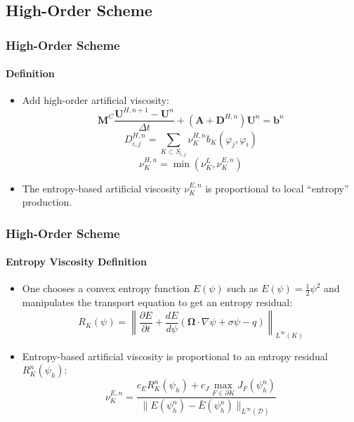\documentclass{beamer}
\newcommand{\pd}[2]{\frac{\partial #1}{\partial #2}}
\renewcommand{\ij}{_{i,j}}
\newcommand{\U}{\mathbf{U}}
\newcommand{\M}{\mathbf{M}}
\newcommand{\A}{\mathbf{A}}
\newcommand{\D}{\mathbf{D}}
\renewcommand{\b}{\mathbf{b}}
\newcommand{\dt}{\Delta t}
\begin{document}
\subsection{High-Order Scheme}
\begin{frame}
\frametitle{High-Order Scheme}
\framesubtitle{Definition}

\begin{itemize}
   \item Add high-order artificial viscosity:
   \begin{equation}
      \M^C\frac{\U^{H,n+1}-\U^n}{\dt} + (\A + \D^{H,n})\U^n = \b^n
   \end{equation}
   \begin{equation}
      D\ij^{H,n} = \sum\limits_{K\subset S\ij}\nu_K^{H,n} b_K(\varphi_j,\varphi_i)
   \end{equation}
   \begin{equation}
      \nu^{H,n}_K = \min(\nu^{L}_K,\nu^{E,n}_K)
   \end{equation}
   \item The entropy-based artificial viscosity $\nu^{E,n}_K$ is
   proportional to local ``entropy'' production.
\end{itemize}

\end{frame}
\begin{frame}
\frametitle{High-Order Scheme}
\framesubtitle{Entropy Viscosity Definition}

\begin{itemize}
   \item One chooses a convex entropy function $E(\psi)$ such
   as $E(\psi)=\frac{1}{2}\psi^2$ and manipulates the
   transport equation to get an entropy residual:
   \begin{equation}
      R_K(\psi) = \left\|\pd{E}{t}
      + \frac{dE}{d\psi}\left(\mathbf{\Omega}\cdot\nabla \psi
      + \sigma \psi
      - q \right)\right\|_{L^\infty(K)}
   \end{equation}
   \item Entropy-based artificial viscosity is proportional to an entropy
   residual $R_K^n(\psi_h)$:
   \begin{equation}
      \nu^{E,n}_K = \frac{c_E R_K^n(\psi_h)
      + c_J\max\limits_{F\in\partial K}J_F(\psi_h^n)}
      {\|E(\psi_h^n)-\bar{E}(\psi_h^n)\|_{L^\infty(\mathcal{D})}}
   \end{equation}
\end{itemize}
   
\end{frame}
\end{document}
